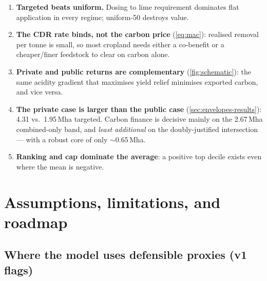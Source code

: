 \documentclass[openany]{book}
\begin{document}
\begin{enumerate}
\item \textbf{Targeted beats uniform.} Dosing to lime requirement dominates flat
application in every regime; uniform-50 destroys value.
\item \textbf{The CDR rate binds, not the carbon price} (\autoref{eq:mac}):
realised removal per tonne is small, so most cropland needs either a co-benefit
or a cheaper/finer feedstock to clear on carbon alone.
\item \textbf{Private and public returns are complementary}
(\autoref{fig:schematic}): the same acidity gradient that maximises yield relief
minimises exported carbon, and vice versa.
\item \textbf{The private case is larger than the public case}
(\autoref{sec:envelopes-results}): 4.31 vs.\ 1.95\,Mha targeted. Carbon finance is
decisive mainly on the 2.67\,Mha combined-only band, and \emph{least additional}
on the doubly-justified intersection --- with a robust core of only
$\sim$0.65\,Mha.
\item \textbf{Ranking and cap dominate the average}: a positive top decile exists
even where the mean is negative.
\end{enumerate}

\chapter{Assumptions, limitations, and roadmap}\label{ch:roadmap}

\section{Where the model uses defensible proxies (v1 flags)}
\end{document}
